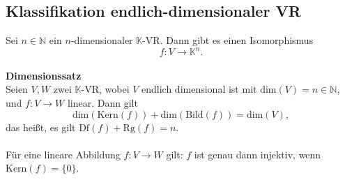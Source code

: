 \documentclass[a4paper,12pt]{article}
\begin{document}
\subsection{Klassifikation endlich-dimensionaler VR}
Sei $n  \in  \mathbb{N}$ ein $n$-dimensionaler $\mathbb{K}$-VR. Dann gibt es einen Isomorphismus
\[ 
        f:V\rightarrow \mathbb{K}^{n}
.\] 
\hfill\\\textbf{Dimensionssatz}\\ 
Seien $V,W$ zwei $\mathbb{K}$-VR, wobei $V$ endlich dimensional ist mit $\text{dim}\left(V\right)=n  \in \mathbb{N}$, und $f:V\rightarrow W$ linear. Dann gilt
\[ 
        \text{dim}\left(\text{Kern}\left(f\right)\right)+\text{dim}\left(\text{Bild}\left(f\right)\right)=\text{dim}\left(V\right)
,\] 
das heißt, es gilt $\text{Df}\left(f\right)+\text{Rg}\left(f\right)=n$.\\\\
Für eine lineare Abbildung $f:V\rightarrow W$ gilt: $f$ ist genau dann injektiv, wenn $\text{Kern}\left(f\right)=\{0\}$.
\end{document}
